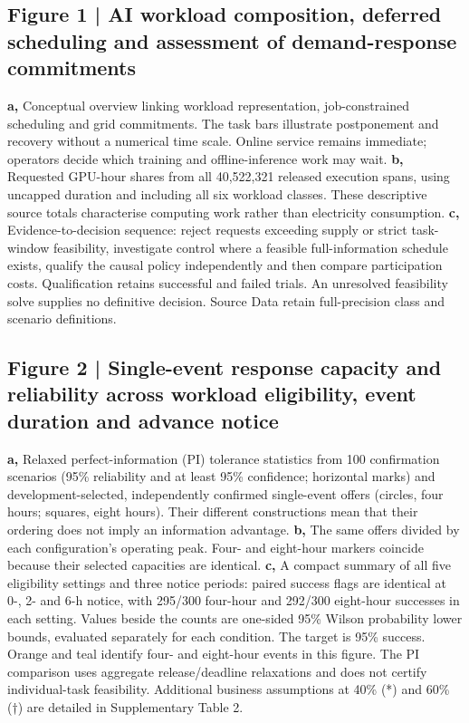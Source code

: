 \documentclass[10pt,a4paper]{article}
\begin{document}
\begin{minipage}{\textwidth}
\subsection*{Figure 1 | AI workload composition, deferred scheduling and assessment of demand-response commitments}

\textbf{a,} Conceptual overview linking workload representation, job-constrained scheduling and grid commitments. The task bars illustrate postponement and recovery without a numerical time scale. Online service remains immediate; operators decide which training and offline-inference work may wait. \textbf{b,} Requested GPU-hour shares from all 40,522,321 released execution spans, using uncapped duration and including all six workload classes. These descriptive source totals characterise computing work rather than electricity consumption. \textbf{c,} Evidence-to-decision sequence: reject requests exceeding supply or strict task-window feasibility, investigate control where a feasible full-information schedule exists, qualify the causal policy independently and then compare participation costs. Qualification retains successful and failed trials. An unresolved feasibility solve supplies no definitive decision. Source Data retain full-precision class and scenario definitions.
\end{minipage}\par\vspace{7pt}
\begin{minipage}{\textwidth}
\subsection*{Figure 2 | Single-event response capacity and reliability across workload eligibility, event duration and advance notice}

\textbf{a,} Relaxed perfect-information (PI) tolerance statistics from 100 confirmation scenarios (95\% reliability and at least 95\% confidence; horizontal marks) and development-selected, independently confirmed single-event offers (circles, four hours; squares, eight hours). Their different constructions mean that their ordering does not imply an information advantage. \textbf{b,} The same offers divided by each configuration's operating peak. Four- and eight-hour markers coincide because their selected capacities are identical. \textbf{c,} A compact summary of all five eligibility settings and three notice periods: paired success flags are identical at 0-, 2- and 6-h notice, with 295/300 four-hour and 292/300 eight-hour successes in each setting. Values beside the counts are one-sided 95\% Wilson probability lower bounds, evaluated separately for each condition. The target is 95\% success. Orange and teal identify four- and eight-hour events in this figure. The PI comparison uses aggregate release/deadline relaxations and does not certify individual-task feasibility. Additional business assumptions at 40\% (*) and 60\% (†) are detailed in Supplementary Table 2.
\end{minipage}\par\vspace{7pt}
\end{document}
